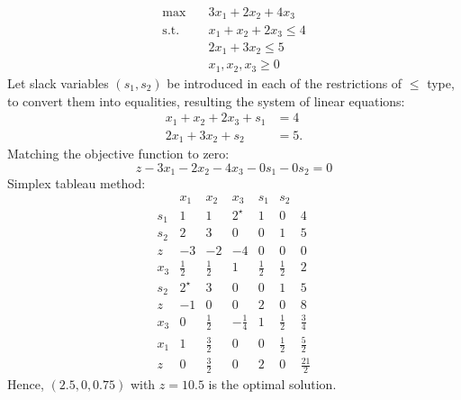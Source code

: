 \documentclass{homework}
\begin{document}
\begin{align*}
	\text{max} \quad
	&3x_1 + 2x_2 +4x_3 \\
	\text{s.t.} \quad
	&x_1 + x_2 + 2x_3\leq 4 \\
	&2x_1 + 3x_2 \leq 5 \\
	&x_1, x_2, x_3 \geq 0
\end{align*}
Let slack variables $(s_1, s_2)$ be introduced in each of the restrictions of $\leq$ type, to convert them into equalities, resulting the system of linear equations:
\begin{align*}
  x_1 + x_2 + 2x_3 + s_1 &= 4\\
  2x_1 + 3x_2 + s_2 &= 5.
\end{align*}
Matching the objective function to zero: \[z - 3x_1 - 2x_2 - 4x_3 - 0s_1 - 0s_2 = 0\]
Simplex tableau method:
\begin{equation*}
  \begin{array}{rrrrrr|r}
        &  x_1 &  x_2 &  x_3 & s_1 & s_2 &       \\ \hline
  s_1 & 1     & 1     & 2^\star&   1    &      0 &   4 \\
  s_2 &  2    & 3     &  0    &    0   &      1 &   5 \\ \hline
  z    & -3    & -2    & -4    &    0   &      0 &   0 \\ \hline\hline
  x_3 & \frac{1}{2} &  \frac{1}{2} &  1 &  \frac{1}{2} & \frac{1}{2} & 2\\
  s_2 &  2^\star &  3 &  0 &    0 &   1 &    5 \\ \hline
  z    &  -1 &    0 & 0 &    2 &   0 &   8 \\ \hline\hline
  x_3 & 0 &  \frac{1}{2} &  -\frac{1}{4} &  1 & \frac{1}{2} & \frac{3}{4}\\
  x_1 &  1 &  \frac{3}{2} &  0 &    0 &   \frac{1}{2} & \frac{5}{2} \\ \hline
  z    &  0 &   \frac{3}{2} & 0 &    2 &   0 &   \frac{21}{2}
  \end{array}
\end{equation*}
Hence, $(2.5, 0, 0.75)$ with $z = 10.5$ is the optimal solution.
\end{document}
